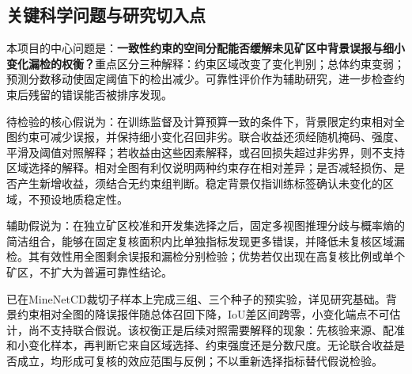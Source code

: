 \subsection{关键科学问题与研究切入点}
本项目的中心问题是：\textbf{一致性约束的空间分配能否缓解未见矿区中背景误报与细小变化漏检的权衡？}重点区分三种解释：约束区域改变了变化判别；总体约束变弱；预测分数移动使固定阈值下的检出减少。可靠性评价作为辅助研究，进一步检查约束后残留的错误能否被排序发现。

待检验的核心假说为：在训练监督及计算预算一致的条件下，背景限定约束相对全图约束可减少误报，并保持细小变化召回非劣。联合收益还须经随机掩码、强度、平滑及阈值对照解释；若收益由这些因素解释，或召回损失超过非劣界，则不支持区域选择的解释。相对全图有利仅说明两种约束存在相对差异；是否减轻损伤、是否产生新增收益，须结合无约束组判断。稳定背景仅指训练标签确认未变化的区域，不预设地质稳定性。

辅助假说为：在独立矿区校准和开发集选择之后，固定多视图推理分歧与概率熵的简洁组合，能够在固定复核面积内比单独指标发现更多错误，并降低未复核区域漏检。其有效性用全图剩余误报和漏检分别检验；优势若仅出现在高复核比例或单个矿区，不扩大为普遍可靠性结论。

已在MineNetCD裁切子样本上完成三组、三个种子的预实验，详见研究基础。背景约束相对全图的降误报伴随总体召回下降，IoU差区间跨零，小变化端点不可估计，尚不支持联合假说。该权衡正是后续对照需要解释的现象：先核验来源、配准和小变化样本，再判断它来自区域选择、约束强度还是分数尺度。无论联合收益是否成立，均形成可复核的效应范围与反例；不以重新选择指标替代假说检验。
